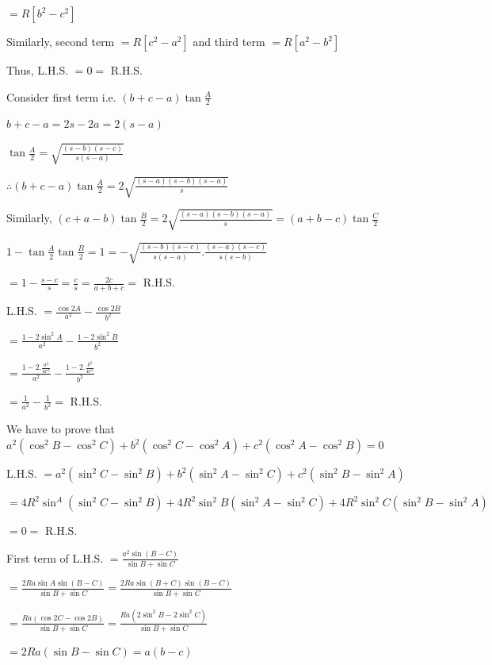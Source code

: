   $= R[b^2 - c^2]$

  Similarly, second term $= R[c^2 - a^2]$ and third term $= R[a^2 - b^2]$

  Thus, L.H.S. $= 0 =$ R.H.S.

\item Consider first term i.e. $(b + c - a)\tan \frac{A}{2}$

  $b + c - a = 2s - 2a = 2(s - a)$

  $\tan\frac{A}{2} = \sqrt{\frac{(s - b)(s - c)}{s(s - a)}}$

  $\therefore (b + c - a)\tan \frac{A}{2} = 2\sqrt{\frac{(s - a)(s - b)(s - a)}{s}}$

  Similarly, $(c + a - b)\tan \frac{B}{2} = 2\sqrt{\frac{(s - a)(s - b)(s - a)}{s}} = (a + b - c)\tan\frac{C}{2}$

\item $1 - \tan\frac{A}{2}\tan\frac{B}{2} = 1 =- \sqrt{\frac{(s - b)(s - c)}{s(s - a)}.\frac{(s - a)(s - c)}{s(s - b)}}$

  $= 1 - \frac{s - c}{s} = \frac{c}{s} = \frac{2c}{a + b + c} =$ R.H.S.

\item L.H.S. $= \frac{\cos2A}{a^2} - \frac{\cos2B}{b^2}$

  $= \frac{1 - 2\sin^2A}{a^2} - \frac{1 - 2\sin^2B}{b^2}$

  $= \frac{1 - 2.\frac{a^2}{4r^2}}{a^2} - \frac{1 - 2.\frac{b^2}{4r^2}}{b^2}$

  $= \frac{1}{a^2} - \frac{1}{b^2} =$ R.H.S.

\item We have to prove that $a^2(\cos^2B - \cos^2C) + b^2(\cos^2C - \cos^2A) + c^2(\cos^2A - \cos^2B) = 0$

  L.H.S. $= a^2(\sin^2C - \sin^2B) + b^2(\sin^2A - \sin^2C) + c^2(\sin^2B - \sin^2A)$

  $= 4R^2\sin^A(\sin^2C - \sin^2B) + 4R^2\sin^2B(\sin^2A - \sin^2C) + 4R^2\sin^2C(\sin^2B - \sin^2A)$

  $= 0 =$ R.H.S.

\item First term of L.H.S. $= \frac{a^2\sin(B - C)}{\sin B + \sin C}$

  $= \frac{2Ra\sin A\sin(B - C)}{\sin B + \sin C} = \frac{2Ra\sin(B + C)\sin(B - C)}{\sin B + \sin C}$

  $= \frac{Ra(\cos 2C - \cos 2B)}{\sin B + \sin C} = \frac{Ra(2\sin^2B - 2\sin^2C)}{\sin B + \sin C}$

  $= 2Ra(\sin B - \sin C) = a(b - c)$

